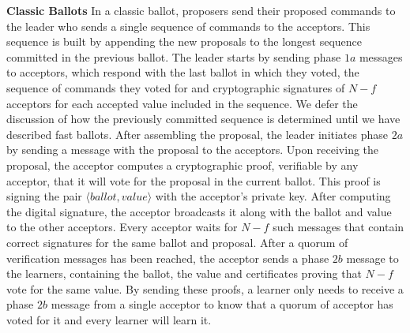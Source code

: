 \textbf{Classic Ballots} In a classic ballot, proposers send their proposed commands to the leader who sends a single sequence of commands to the acceptors. This sequence is built by appending the new proposals to the longest sequence committed in the previous ballot. The leader starts by sending phase $1a$ messages to acceptors, which respond with the last ballot in which they voted, the sequence of commands they voted for and cryptographic signatures of $N-f$ acceptors for each accepted value included in the sequence. We defer the discussion of how the previously committed sequence is determined until we have described fast ballots. After assembling the proposal, the leader initiates phase $2a$ by sending a message with the proposal to the acceptors. Upon receiving the proposal, the acceptor computes a cryptographic proof, verifiable by any acceptor, that it will vote for the proposal in the current ballot. This proof is signing the pair $\langle ballot,value \rangle$ with the acceptor's private key. After computing the digital signature, the acceptor broadcasts it along with the ballot and value to the other acceptors. Every acceptor waits for $N-f$ such messages that contain correct signatures for the same ballot and proposal. After a quorum of verification messages has been reached, the acceptor sends a phase $2b$ message to the learners, containing the ballot, the value and certificates proving that $N-f$ vote for the same value. By sending these proofs, a learner only needs to receive a phase $2b$ message from a single acceptor to know that a quorum of acceptor has voted for it and every learner will learn it. \par
